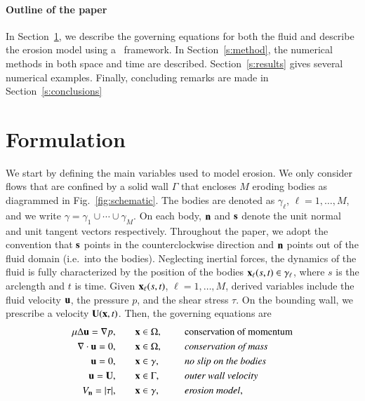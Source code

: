 \documentclass[preprint, 10pt]{elsarticle}
\begin{document}
\paragraph{Outline of the paper} In Section~\ref{s:formulation}, we
describe the governing equations for both the fluid and describe the
erosion model using a \thL~framework.  In Section~\ref{s:method}, the
numerical methods in both space and time are described.
Section~\ref{s:results} gives several numerical examples.  Finally,
concluding remarks are made in Section~\ref{s:conclusions}




\section{Formulation}
\label{s:formulation}
We start by defining the main variables used to model erosion.  We only
consider flows that are confined by a solid wall $\Gamma$ that encloses
$M$ eroding bodies as diagrammed in Fig.~\ref{fig:schematic}.  The bodies are denoted as $\gamma_\ell$, $\ell=1,\ldots,M$, and we write $\gamma = \gamma_1 \cup \cdots \cup \gamma_M$.
On each body, $\nn$ and $\ss$ denote the unit normal and unit tangent vectors respectively. Throughout the paper, we adopt the convention that $\ss$ points in the counterclockwise direction and $\nn$ points out of the fluid domain (i.e.~into the bodies). Neglecting inertial forces, the dynamics of the fluid is
fully characterized by the position of the bodies $\xx_\ell(s,t) \in
\gamma_\ell$, where $s$ is the arclength and $t$ is time.  Given
$\xx_\ell(s,t)$, $\ell=1,\ldots,M$, derived variables include the fluid
velocity $\uu$, the pressure $p$, and the shear stress $\tau$.   On the
bounding wall, we prescribe a velocity $\UU(\xx,t)$.  Then, the
governing equations are
\begin{equation}
\label{eqn:erosionModel}
\begin{split}
  \mu \Delta \uu = \grad p, &\hspace{20pt} \xx \in \Omega, \gap &&\mbox{conservation
of momentum}\\
\grad \cdot \uu = 0, &\hspace{20pt} \xx \in \Omega, \gap
&&\mbox{\em conservation of mass} \\
\uu = 0, &\hspace{20pt} \xx \in \gamma, \gap &&\mbox{\em no slip on the
bodies} \\
\uu = \UU, &\hspace{20pt} \xx \in \Gamma, \gap &&\mbox{\em outer wall
velocity} \\
\Vn = \abs{\tau}, &\hspace{20pt} \xx \in \gamma,
&&\mbox{\em erosion model},
\end{split}
\end{equation}
\end{document}
